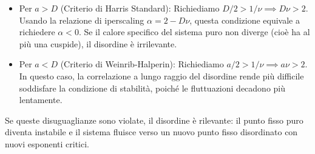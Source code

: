 \begin{itemize}
    \item Per $a > D$ (Criterio di Harris Standard):
    Richiediamo $D/2 > 1/\nu \implies D\nu > 2$.
    Usando la relazione di iperscaling $\alpha = 2 - D\nu$, questa condizione equivale a richiedere $\alpha < 0$. Se il calore specifico del sistema puro non diverge (cioè ha al più una cuspide), il disordine è irrilevante.
    
    \item Per $a < D$ (Criterio di Weinrib-Halperin):
    Richiediamo $a/2 > 1/\nu \implies a\nu > 2$.
    In questo caso, la correlazione a lungo raggio del disordine rende più difficile soddisfare la condizione di stabilità, poiché le fluttuazioni decadono più lentamente.
\end{itemize}

\noindent Se queste disuguaglianze sono violate, il disordine è rilevante: il punto fisso puro diventa instabile e il sistema fluisce verso un nuovo punto fisso disordinato con nuovi esponenti critici.

